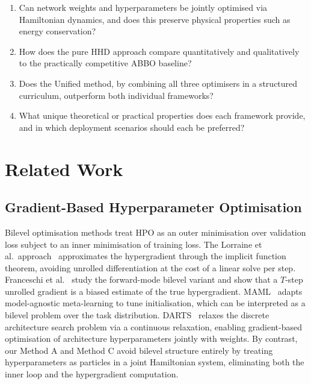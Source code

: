 \documentclass[12pt,a4paper]{article}
\begin{document}
\begin{enumerate}[leftmargin=*, label=\textbf{RQ\arabic*.}]
\item Can network weights and hyperparameters be jointly optimised via
      Hamiltonian dynamics, and does this preserve physical properties
      such as energy conservation?
\item How does the pure HHD approach compare quantitatively and
      qualitatively to the practically competitive ABBO baseline?
\item Does the Unified method, by combining all three optimisers in a
      structured curriculum, outperform both individual frameworks?
\item What unique theoretical or practical properties does each
      framework provide, and in which deployment scenarios should
      each be preferred?
\end{enumerate}




\section{Related Work}
\label{sec:related}

\subsection{Gradient-Based Hyperparameter Optimisation}

Bilevel optimisation methods treat HPO as an outer minimisation over
validation loss subject to an inner minimisation of training loss.  The
Lorraine et al.\ approach~\cite{lorraine2020} approximates the
hypergradient through the implicit function theorem, avoiding
unrolled differentiation at the cost of a linear solve per step.
Franceschi et al.~\cite{franceschi2018} study the forward-mode
bilevel variant and show that a $T$-step unrolled gradient is a
biased estimate of the true hypergradient.  MAML~\cite{finn2017maml}
adapts model-agnostic meta-learning to tune initialisation, which
can be interpreted as a bilevel problem over the task distribution.
DARTS~\cite{liu2019darts} relaxes the discrete architecture search
problem via a continuous relaxation, enabling gradient-based
optimisation of architecture hyperparameters jointly with weights.
By contrast, our Method A and Method C avoid bilevel structure
entirely by treating hyperparameters as particles in a joint
Hamiltonian system, eliminating both the inner loop and the
hypergradient computation.
\end{document}
